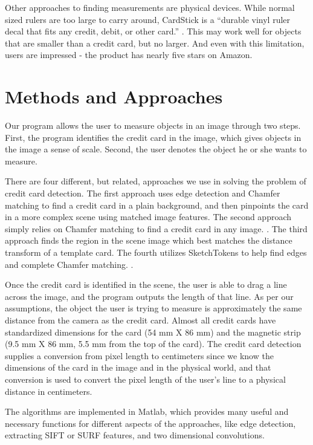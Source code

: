 \documentclass[10pt,twocolumn,letterpaper]{article}
\begin{document}
Other approaches to finding measurements are physical devices. While normal sized rulers are too large to carry around, CardStick is a “durable vinyl ruler decal that fits any credit, debit, or other card.” \cite{CardStick}. This may work well for objects that are smaller than a credit card, but no larger. And even with this limitation, users are impressed - the product has nearly five stars on Amazon.

\section{Methods and Approaches}

Our program allows the user to measure objects in an image through two steps. First, the program identifies the credit card in the image, which gives objects in the image a sense of scale. Second, the user denotes the object he or she wants to measure. 

There are four different, but related, approaches we use in solving the problem of credit card detection. The first approach uses edge detection and Chamfer matching to find a credit card in a plain background, and then pinpoints the card in a more complex scene using matched image features. The second approach simply relies on Chamfer matching to find a credit card in any image. \cite{chamfer}. The third approach finds the region in the scene image which best matches the distance transform of a template card. The fourth utilizes SketchTokens to help find edges and complete Chamfer matching. \cite{SketchTokens}. 

Once the credit card is identified in the scene, the user is able to drag a line across the image, and the program outputs the length of that line. As per our assumptions, the object the user is trying to measure is approximately the same distance from the camera as the credit card. Almost all credit cards have standardized dimensions for the card (54 mm X 86 mm) and the magnetic strip (9.5 mm X 86 mm, 5.5 mm from the top of the card). The credit card detection supplies a conversion from pixel length to centimeters since we know the dimensions of the card in the image and in the physical world, and that conversion is used to convert the pixel length of the user’s line to a physical distance in centimeters. 

	The algorithms are implemented in Matlab, which provides many useful and necessary functions for different aspects of the approaches, like edge detection, extracting SIFT or SURF features, and two dimensional convolutions.  
\end{document}
